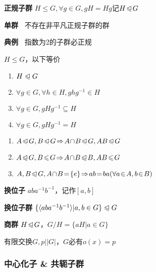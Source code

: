 \documentclass[b4paper, 10pt]{ctexart}
\newcommand*{\impl}{\Rightarrow}
\renewcommand*{\leq}{\leqslant}
\newcommand*{\nmsubgroupeq}{\trianglelefteqslant}
\newcommand*{\gengroup}[1]{\langle #1 \rangle}
\begin{document}
\begin{multicols}{3}
    \textbf{正规子群} $H \!\!\leq\!\! G, \forall g \!\in\! G, gH \! = \! Hg$记$H \!\nmsubgroupeq\! G$

    \textbf{单群\ } 不存在非平凡正规子群的群

    \textbf{典例\ } 指数为2的子群必正规

    \begin{theorem}[正规子群判则]
        $H \leq G$，以下等价
        \begin{enumerate}
            \item $H \nmsubgroupeq G$
            \item $\forall g \in G,\forall h \in H, ghg^{-1} \in H$
            \item $\forall g \in G, gHg^{-1} \subseteq H$
            \item $\forall g \in G, gHg^{-1} = H$
        \end{enumerate}
    \end{theorem}

    \begin{theorem}[正规子群运算律]
        \hfil

        \begin{enumerate}
            \item $A \!\nmsubgroupeq\! G, B \!\nmsubgroupeq\! G \!\impl\! A \!\cap\! B \!\nmsubgroupeq\! G, AB \!\nmsubgroupeq\! G$
            \item $A \!\nmsubgroupeq\! G, B \!\leq\! G \!\impl\! A \!\cap\! B \!\nmsubgroupeq\! B, AB \!\leq\! G$
            \item $A, B \!\nmsubgroupeq\! G, A \!\cap\! B \! = \! \{e\} \!\impl\! ab \! = \! ba \\ (\forall a \!\in\! A, b \!\in\! B)$
        \end{enumerate}
    \end{theorem}

    \textbf{换位子} $aba^{-1}b^{-1}$，记作$[a,b]$

    \textbf{换位子群} $\{ \gengroup{aba^{-1}b^{-1}} | a, b \in G \} \nmsubgroupeq G$

    \textbf{商群} $H \!\nmsubgroupeq\! G$，$G/H = \{ aH | a \in G \}$

    \begin{theorem}[素阶元]
        有限交换$G, p||G|$，$G$必有$o(x) \! = \! p$
    \end{theorem}

    \subsubsection{中心化子 \& 共轭子群}


\end{multicols}
\end{document}
